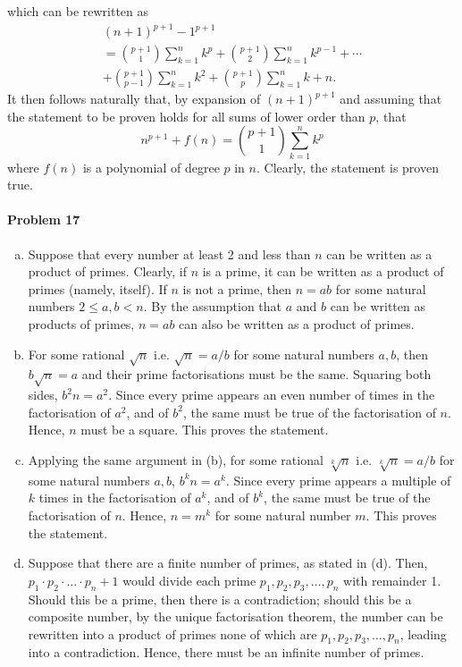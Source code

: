 \documentclass{article}
\begin{document}
which can be rewritten as
\begin{multline*}
  (n+1)^{p+1} - 1^{p+1} \\
  = \binom{p+1}{1} \sum^n_{k=1} k^p + \binom{p+1}{2} \sum^n_{k=1} k^{p-1} +
  \cdots \\
  + \binom{p+1}{p-1} \sum^n_{k=1} k^2 + \binom{p+1}{p} \sum^n_{k=1} k + n.
\end{multline*}
It then follows naturally that, by expansion of $(n + 1)^{p+1}$ and assuming
that the statement to be proven holds for all sums of lower order than $p$,
that \[
  n^{p+1} + f(n) = \binom{p+1}{1} \sum^n_{k=1} k^p
\] where $f(n)$ is a polynomial of degree $p$ in $n$. Clearly, the statement is
proven true.

\paragraph{Problem 17}
\begin{enumerate}[(a)]
  \item Suppose that every number at least 2 and less than $n$ can be written
    as a product of primes. Clearly, if $n$ is a prime, it can be written as a
    product of primes (namely, itself). If $n$ is not a prime, then $n = ab$
    for some natural numbers $2 \leq a, b < n$. By the assumption that $a$ and
    $b$ can be written as products of primes, $n = ab$ can also be written as a
    product of primes.
  \item For some rational $\sqrt{n}$ i.e. $\sqrt{n} = a/b$ for some natural
   numbers $a, b$, then $b\sqrt{n} = a$ and their prime factorisations must be
   the same. Squaring both sides, $b^2n = a^2$. Since every prime appears an
   even number of times in the factorisation of $a^2$, and of $b^2$, the same
   must be true of the factorisation of $n$. Hence, $n$ must be a square. This
   proves the statement.
  \item Applying the same argument in (b), for some rational $\sqrt[k]{n}$ i.e.
    $\sqrt[k]{n} = a/b$ for some natural numbers $a, b$, $b^kn = a^k$. Since
    every prime appears a multiple of $k$ times in the factorisation of $a^k$,
    and of $b^k$, the same must be true of the factorisation of $n$. Hence, $n
    = m^k$ for some natural number $m$. This proves the statement.
  \item Suppose that there are a finite number of primes, as stated in (d).
    Then, $p_1 \cdot p_2 \cdot \ldots \cdot p_n + 1$ would divide each prime
    $p_1, p_2, p_3, \ldots, p_n$ with remainder 1. Should this be a prime, then
    there is a contradiction; should this be a composite number, by the unique
    factorisation theorem, the number can be rewritten into a product of primes
    none of which are $p_1, p_2, p_3, \ldots, p_n$, leading into a
    contradiction. Hence, there must be an infinite number of primes.
\end{enumerate}
\end{document}
